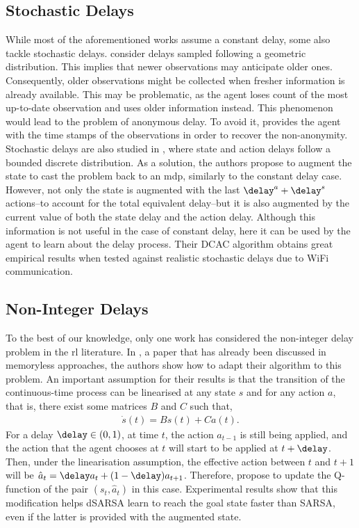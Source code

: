 \subsection{Stochastic Delays}
\label{subsec:stochastic_related}
While most of the aforementioned works assume a constant delay, some also tackle stochastic delays.
\cite{agarwal2021blind} consider delays sampled following a geometric distribution. 
This implies that newer observations may anticipate older ones. 
Consequently, older observations might be collected when fresher information is already available. 
This may be problematic, as the agent loses count of the most up-to-date observation and uses older information instead. 
This phenomenon would lead to the problem of anonymous delay.
To avoid it, \cite{agarwal2021blind} provides the agent with the time stamps of the observations in order to recover the non-anonymity.
Stochastic delays are also studied in \cite{bouteiller2020reinforcement}, where state and action delays follow a bounded discrete distribution. 
As a solution, the authors propose to augment the state to cast the problem back to an \gls{mdp}, similarly to the constant delay case.
However, not only the state is augmented with the last $\delay^a+\delay^s$ actions--to account for the total equivalent delay--but it is also augmented by the current value of both the state delay and the action delay. 
Although this information is not useful in the case of constant delay, here it can be used by the agent to learn about the delay process.
Their DCAC algorithm obtains great empirical results when tested against realistic stochastic delays due to WiFi communication.


\subsection{Non-Integer Delays}
\label{subsec:non_int_related}
To the best of our knowledge, only one work has considered the non-integer delay problem in the \gls{rl} literature. 
In \cite{schuitema2010control}, a paper that has already been discussed in memoryless approaches, the authors show how to adapt their algorithm to this problem.
An important assumption for their results is that the transition of the continuous-time process can be linearised at any state $s$ and for any action $a$, that is, there exist some matrices $B$ and $C$ such that,
\begin{align*}
    \dot{s}(t)=Bs(t) + Ca(t).
\end{align*}
For a delay $\delay\in(0,1)$, at time $t$, the action $a_{t-1}$ is still being applied, and the action that the agent chooses at $t$ will start to be applied at $t+\delay$. 
Then, under the linearisation assumption, the effective action between $t$ and $t+1$ will be $\hat{a}_t = \delay a_t + (1-\delay) a_{t+1}$. 
Therefore, \cite{schuitema2010control} propose to update the Q-function of the pair $(s_t,\hat{a}_t)$ in this case. 
Experimental results show that this modification helps dSARSA learn to reach the goal state faster than SARSA, even if the latter is provided with the augmented state. 


